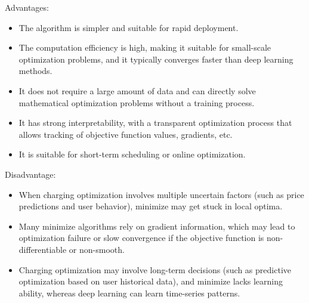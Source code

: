 \documentclass[
english,
ruledheaders=section,%
class=report,%
thesis={type=Report},%
accentcolor=9c,%
custommargins=true,%
marginpar=false,%
parskip=half-,%
fontsize=11pt,%
logofile={img/tuda_logo.pdf}, %
]{tudapub}
\begin{document}
    Advantages:
    \begin{itemize}

        \item The algorithm is simpler and suitable for rapid deployment.
        \item The computation efficiency is high, making it suitable for small-scale optimization problems, and it typically converges faster than deep learning methods.
        \item It does not require a large amount of data and can directly solve mathematical optimization problems without a training process.
        \item It has strong interpretability, with a transparent optimization process that allows tracking of objective function values, gradients, etc.
        \item It is suitable for short-term scheduling or online optimization.
    \end{itemize}
    Disadvantage:
    \begin{itemize}
        \item When charging optimization involves multiple uncertain factors (such as price predictions and user behavior), minimize may get stuck in local optima.
        \item Many minimize algorithms rely on gradient information, which may lead to optimization failure or slow convergence if the objective function is non-differentiable or non-smooth.
        \item Charging optimization may involve long-term decisions (such as predictive optimization based on user historical data), and minimize lacks learning ability, whereas deep learning can learn time-series patterns.
    \end{itemize}
\end{document}
